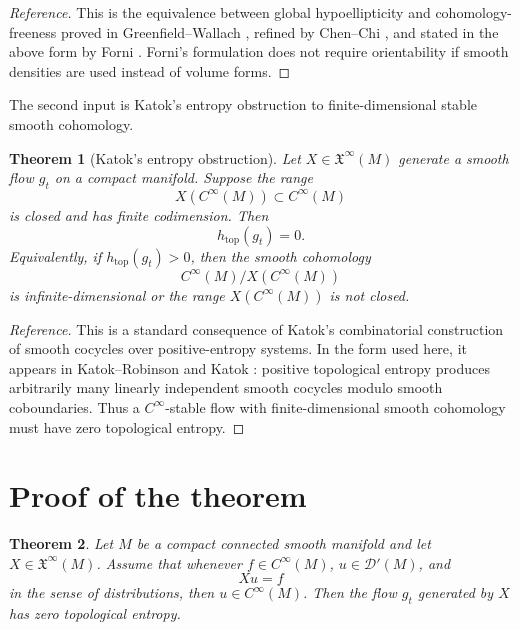 \documentclass[11pt]{article}
\newtheorem{theorem}{Theorem}
\newcommand{\D}{\mathcal D}
\newcommand{\htop}{h_{\mathrm{top}}}
\begin{document}
\begin{proof}[Reference]
This is the equivalence between global hypoellipticity and
cohomology-freeness proved in Greenfield--Wallach \cite{GW73}, refined by
Chen--Chi \cite{CC00}, and stated in the above form by Forni
\cite[Theorem 3.10]{Forni08}.  Forni's formulation does not require orientability
if smooth densities are used instead of volume forms.
\end{proof}

The second input is Katok's entropy obstruction to finite-dimensional stable
smooth cohomology.

\begin{theorem}[Katok's entropy obstruction]
\label{thm:Katok}
Let \(X\in\mathfrak X^\infty(M)\) generate a smooth flow \(g_t\) on a compact
manifold.  Suppose the range
\[
        X(C^\infty(M))\subset C^\infty(M)
\]
is closed and has finite codimension.  Then
\[
        \htop(g_t)=0 .
\]
Equivalently, if \(\htop(g_t)>0\), then the smooth cohomology
\[
        C^\infty(M)/X(C^\infty(M))
\]
is infinite-dimensional or the range \(X(C^\infty(M))\) is not closed.
\end{theorem}

\begin{proof}[Reference]
This is a standard consequence of Katok's combinatorial construction of smooth
cocycles over positive-entropy systems.  In the form used here, it appears in
Katok--Robinson \cite[Section 6]{KR01} and Katok \cite[Chapter 6]{Katok03}:
positive topological entropy produces arbitrarily many linearly independent
smooth cocycles modulo smooth coboundaries.  Thus a \(C^\infty\)-stable flow
with finite-dimensional smooth cohomology must have zero topological entropy.
\end{proof}

\section{Proof of the theorem}

\begin{theorem}
Let \(M\) be a compact connected smooth manifold and let \(X\in\mathfrak X^\infty(M)\).
Assume that whenever \(f\in C^\infty(M)\), \(u\in\D'(M)\), and
\[
        Xu=f
\]
in the sense of distributions, then \(u\in C^\infty(M)\).  Then the flow
\(g_t\) generated by \(X\) has zero topological entropy.
\end{theorem}
\end{document}
